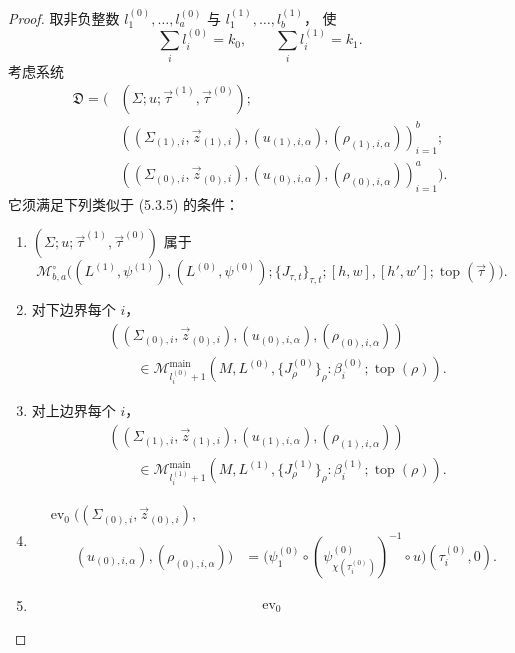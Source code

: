 \begin{proof}
取非负整数
$l_1^{(0)},\ldots,l_a^{(0)}$
与 $l_1^{(1)},\ldots,l_b^{(1)}$，
使
\[
\sum_i l_i^{(0)}=k_0,
\qquad
\sum_i l_i^{(1)}=k_1.
\]
考虑系统
\[
\begin{aligned}
\mathfrak D=\bigl(
 &(\Sigma;u;\vec\tau^{(1)},\vec\tau^{(0)});
\\[-1mm]
 &((\Sigma_{(1),i},\vec z_{(1),i}),
   (u_{(1),i,\alpha}),
   (\rho_{(1),i,\alpha}))_{i=1}^{b};
\\[-1mm]
 &((\Sigma_{(0),i},\vec z_{(0),i}),
   (u_{(0),i,\alpha}),
   (\rho_{(0),i,\alpha}))_{i=1}^{a}
\bigr).
\end{aligned}
\]
它须满足下列类似于 (5.3.5) 的条件：
\begin{enumerate}[
 label=\textup{(5.3.23.\arabic*)},
 leftmargin=6.4em]
\item\label{cond:5-3-23-1}
$(\Sigma;u;\vec\tau^{(1)},\vec\tau^{(0)})$
属于
\[
\mathcal M^\circ_{b,a}
\bigl((L^{(1)},\psi^{(1)}),
(L^{(0)},\psi^{(0)});
\{J_{\tau,t}\}_{\tau,t};
[h,w],[h',w'];\operatorname{top}(\vec\tau)\bigr).
\]
\item\label{cond:5-3-23-2}
对下边界每个 $i$，
\[
\begin{aligned}
&((\Sigma_{(0),i},\vec z_{(0),i}),
(u_{(0),i,\alpha}),
(\rho_{(0),i,\alpha}))
\\
&\hspace{2em}\in
\mathcal M^{\mathrm{main}}_{l_i^{(0)}+1}
(M,L^{(0)},\{J^{(0)}_\rho\}_\rho:\beta_i^{(0)};\operatorname{top}(\rho)).
\end{aligned}
\]
\item\label{cond:5-3-23-3}
对上边界每个 $i$，
\[
\begin{aligned}
&((\Sigma_{(1),i},\vec z_{(1),i}),
(u_{(1),i,\alpha}),
(\rho_{(1),i,\alpha}))
\\
&\hspace{2em}\in
\mathcal M^{\mathrm{main}}_{l_i^{(1)}+1}
(M,L^{(1)},\{J^{(1)}_\rho\}_\rho:\beta_i^{(1)};\operatorname{top}(\rho)).
\end{aligned}
\]
\item\label{cond:5-3-23-4}
\[
\begin{aligned}
\operatorname{ev}_0
\bigl((\Sigma_{(0),i},\vec z_{(0),i}),
\\
\qquad(u_{(0),i,\alpha}),
(\rho_{(0),i,\alpha})\bigr)
&=
\bigl(
\psi_1^{(0)}
\circ(\psi_{\chi(\tau_i^{(0)})}^{(0)})^{-1}
\circ u
\bigr)(\tau_i^{(0)},0).
\end{aligned}
\]
\item\label{cond:5-3-23-5}
\[
\begin{aligned}
\operatorname{ev}_0

\end{aligned}\]
\end{enumerate}
\end{proof}

